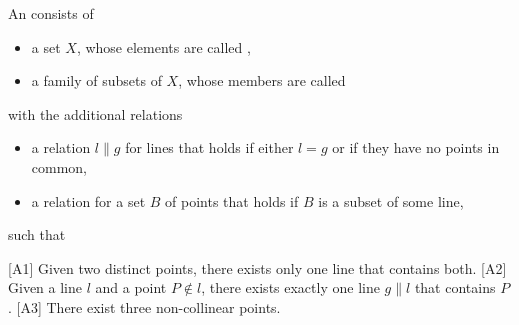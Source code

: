 \begin{definition}\label{def:affine_plane}\cite[1]{Hartshorne1967}
  An  consists of
  \begin{itemize}
    \item a set \( X \), whose elements are called ,
    \item a family of subsets of \( X \), whose members are called 
  \end{itemize}
  with the additional relations
  \begin{itemize}
    \item a  relation \( l \parallel g \) for lines that holds if either \( l = g \) or if they have no points in common,
    \item a  relation for a set \( B \) of points that holds if \( B \) is a subset of some line,
  \end{itemize}
  such that
  \begin{defenum}
    [A1] Given two distinct points, there exists only one line that contains both.
    [A2] Given a line \( l \) and a point \( P \not\in l \), there exists exactly one line \( g \parallel l \) that contains \( P \).
    [A3] There exist three non-collinear points.
  \end{defenum}
\end{definition}

